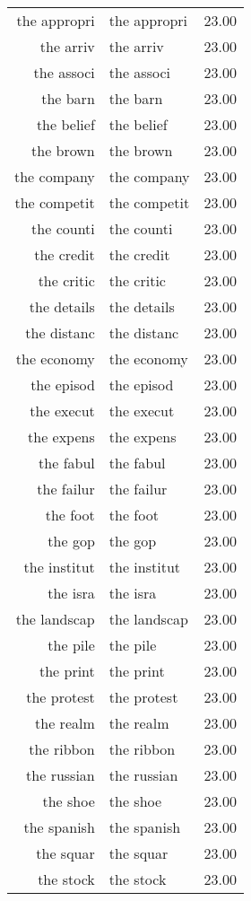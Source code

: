 \begin{table}[ht]
\begin{tabular}{rlr}
  the appropri & the appropri & 23.00 \\ 
  the arriv & the arriv & 23.00 \\ 
  the associ & the associ & 23.00 \\ 
  the barn & the barn & 23.00 \\ 
  the belief & the belief & 23.00 \\ 
  the brown & the brown & 23.00 \\ 
  the company & the company & 23.00 \\ 
  the competit & the competit & 23.00 \\ 
  the counti & the counti & 23.00 \\ 
  the credit & the credit & 23.00 \\ 
  the critic & the critic & 23.00 \\ 
  the details & the details & 23.00 \\ 
  the distanc & the distanc & 23.00 \\ 
  the economy & the economy & 23.00 \\ 
  the episod & the episod & 23.00 \\ 
  the execut & the execut & 23.00 \\ 
  the expens & the expens & 23.00 \\ 
  the fabul & the fabul & 23.00 \\ 
  the failur & the failur & 23.00 \\ 
  the foot & the foot & 23.00 \\ 
  the gop & the gop & 23.00 \\ 
  the institut & the institut & 23.00 \\ 
  the isra & the isra & 23.00 \\ 
  the landscap & the landscap & 23.00 \\ 
  the pile & the pile & 23.00 \\ 
  the print & the print & 23.00 \\ 
  the protest & the protest & 23.00 \\ 
  the realm & the realm & 23.00 \\ 
  the ribbon & the ribbon & 23.00 \\ 
  the russian & the russian & 23.00 \\ 
  the shoe & the shoe & 23.00 \\ 
  the spanish & the spanish & 23.00 \\ 
  the squar & the squar & 23.00 \\ 
  the stock & the stock & 23.00 \\ 

\end{tabular}
\end{table}
